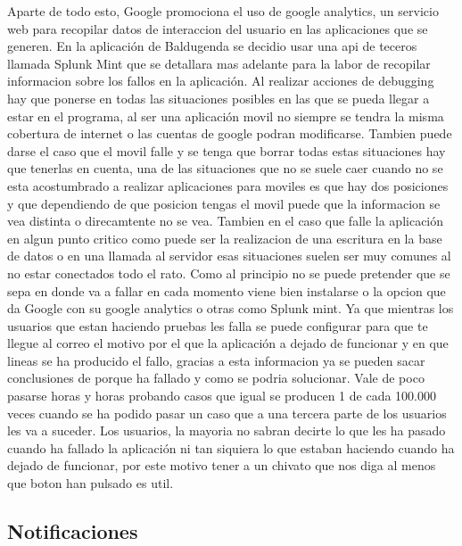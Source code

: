 Aparte de todo esto, Google promociona el uso de google analytics, un servicio web para recopilar datos de interaccion del usuario en las aplicaciones que se generen.
En la aplicación de Baldugenda se decidio usar una api de teceros llamada Splunk Mint que se detallara mas adelante para la labor de recopilar informacion sobre los fallos en la aplicación.
 Al realizar acciones de debugging hay que ponerse en todas las situaciones posibles en las que se pueda llegar a estar en el programa, al ser una aplicación movil no siempre se tendra la misma cobertura de internet o las cuentas de google podran modificarse.
Tambien puede darse el caso que el movil falle y se tenga que borrar  todas estas situaciones hay que tenerlas en cuenta, una de las situaciones que no se suele caer cuando no se esta acostumbrado a realizar aplicaciones para moviles es que hay dos posiciones y que dependiendo de que posicion tengas el movil puede que la informacion se vea distinta o direcamtente no se vea.
Tambien en el caso que falle la aplicación en algun punto critico como puede ser la realizacion de una escritura en la base de datos o en una llamada al servidor esas situaciones suelen ser muy comunes al no estar conectados todo el rato.
Como al principio no se puede pretender que se sepa en donde va a fallar en cada momento viene bien instalarse o la opcion que da Google con su google analytics o otras como Splunk mint.
Ya que mientras los usuarios que estan haciendo pruebas les falla se puede configurar para que te llegue al correo el motivo por el que la aplicación a dejado de funcionar y en que  lineas se ha producido el fallo, gracias a esta informacion ya se pueden sacar conclusiones de porque ha fallado y como se podria solucionar. Vale de poco pasarse horas y horas probando casos que igual se producen 1 de cada 100.000 veces cuando se ha podido pasar un caso que a una tercera parte de los usuarios les va a suceder.
Los usuarios, la mayoria no sabran decirte lo que les ha pasado cuando ha fallado la aplicación ni tan siquiera lo que estaban haciendo cuando ha dejado de funcionar, por este motivo tener a un chivato que nos diga al menos que boton han pulsado es util.

\subsection{Notificaciones}
\label{subsecc:Notificaciones}

